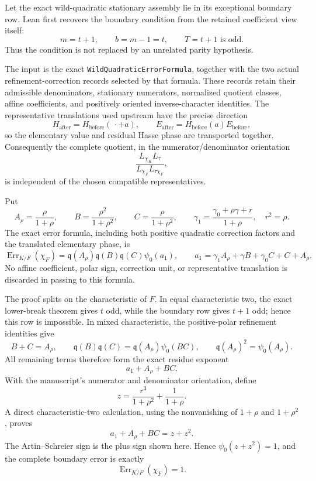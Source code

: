 \begin{theorem}\label{mod:cases-wildquadratic-boundary}
Let the exact wild-quadratic stationary assembly lie in its exceptional
boundary row.  Lean first recovers the boundary condition from the retained
coefficient view itself:
\[
  m=t+1,\qquad b=m-1=t,\qquad T=t+1\text{ is odd}.
\]
Thus the condition is not replaced by an unrelated parity hypothesis.

The input is the exact \texttt{WildQuadraticErrorFormula}, together with the
two actual refinement-correction records selected by that formula.  These
records retain their admissible denominators, stationary numerators,
normalized quotient classes, affine coefficients, and positively oriented
inverse-character identities.  The representative translations used
upstream have the precise direction
\[
 H_{\mathrm{after}}=H_{\mathrm{before}}(\,\cdot+a),\qquad
 E_{\mathrm{after}}=H_{\mathrm{before}}(a)E_{\mathrm{before}},
\]
so the elementary value and residual Hasse phase are transported together.
Consequently the complete quotient, in the numerator/denominator orientation
\[
 \frac{L_{\chi_K}L_\tau}{L_{\chi_F}L_{\tau\chi_F}},
\]
is independent of the chosen compatible representatives.

Put
\[
 A_\rho=\frac{\rho}{1+\rho},\qquad
 B=\frac{\rho^2}{1+\rho^2},\qquad
 C=\frac{\rho}{1+\rho^2},\qquad
 \gamma_1=\frac{\gamma_0+\rho\gamma+r}{1+\rho},
 \quad r^2=\rho.
\]
The exact error formula, including both positive quadratic correction factors
and the translated elementary phase, is
\[
 \operatorname{Err}_{K/F}(\chi_F)
 =\mathfrak q(A_\rho)\mathfrak q(B)\mathfrak q(C)\psi_0(a_1),
 \qquad
 a_1=\gamma_1A_\rho+\gamma B+\gamma_0C+C+A_\rho.
\]
No affine coefficient, polar sign, correction unit, or representative
translation is discarded in passing to this formula.

The proof splits on the characteristic of $F$.  In equal characteristic
two, the exact lower-break theorem gives $t$ odd, while the boundary row
gives $t+1$ odd; hence this row is impossible.  In mixed characteristic,
the positive-polar refinement identities give
\[
 B+C=A_\rho,
 \qquad
 \mathfrak q(B)\mathfrak q(C)
   =\mathfrak q(A_\rho)\psi_0(BC),
 \qquad
 \mathfrak q(A_\rho)^2=\psi_0(A_\rho).
\]
All remaining terms therefore form the exact residue exponent
\[
 a_1+A_\rho+BC.
\]
With the manuscript's numerator and denominator orientation, define
\[
 z=\frac{r^3}{1+\rho^2}+\frac{1}{1+\rho}.
\]
A direct characteristic-two calculation, using the nonvanishing of
$1+\rho$ and $1+\rho^2$, proves
\[
 a_1+A_\rho+BC=z+z^2.
\]
The Artin--Schreier sign is the plus sign shown here.  Hence
\(\psi_0(z+z^2)=1\), and the complete boundary error is exactly
\[
 \operatorname{Err}_{K/F}(\chi_F)=1.
\]


\end{theorem}
